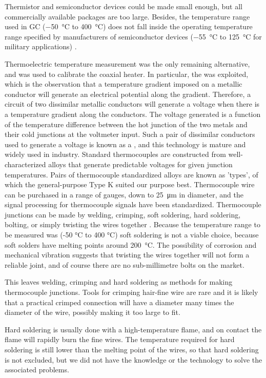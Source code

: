 Thermistor and semiconductor devices could be made small enough, but all
commercially available packages are too large. Besides, the temperature range
used in GC (\SI{-50}{\celsius} to \SI{400}{\celsius}) does not fall inside the
operating temperature range specified by manufacturers of semiconductor devices
(\SI{-55}{\celsius} to \SI{125}{\celsius} for military applications)
\autocite{nullD1996}.

Thermoelectric temperature measurement was the only remaining alternative, and
was used to calibrate the coaxial heater. In particular, the  was exploited, which is the observation that a temperature gradient
imposed on a metallic conductor will generate an electrical potential along the
gradient. Therefore, a circuit of two dissimilar metallic conductors will
generate a voltage when there is a temperature gradient along the conductors.
The voltage generated is a function of the temperature difference between the
hot junction of the two metals and their cold junctions at the voltmeter input.
Such a pair of dissimilar conductors used to generate a voltage is known as a
, and this technology is mature and widely used in
industry. Standard thermocouples are constructed from well-characterized alloys
that generate predictable voltages for given junction temperatures. Pairs of
thermocouple standardized alloys are known as 'types', of which the
general-purpose Type K suited our purpose best. Thermocouple wire can be
purchased in a range of gauges, down to \SI{25}{\micro\metre} in diameter, and
the signal processing for thermocouple signals have been standardized.
Thermocouple junctions can be made by welding, crimping, soft soldering, hard
soldering, bolting, or simply twisting the wires together \autocite{McGee1988}.
Because the temperature range to be measured was ({-}50 \si{\celsius} to 400
\si{\celsius}) soft soldering is not a viable choice, because soft solders have
melting points around \SI{200}{\celsius}. The possibility of corrosion and
mechanical vibration suggests that twisting the wires together will not form a
reliable joint, and of course there are no sub-millimetre bolts on the market.

This leaves welding, crimping and hard soldering as methods for making
thermocouple junctions. Tools for crimping hair-fine wire are rare and it is
likely that a practical crimped connection will have a diameter many times the
diameter of the wire, possibly making it too large to fit.

Hard soldering is usually done with a high-temperature flame, and on contact the
flame will rapidly burn the fine wires. The temperature required for hard
soldering is still lower than the melting point of the wires, so that hard
soldering is not excluded, but we did not have the knowledge or the technology
to solve the associated problems.

